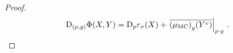 \documentclass[reqno,a4paper,oneside]{amsart}
\newcommand\MC{\mu_{{\rm MC}}}
\theoremstyle{plain}
\theoremstyle{remark}
\theoremstyle{definition}
\def\bas#1\eas{\begin{align*}#1\end{align*}}
\begin{document}
\begin{proof}
\begin{align*}
\mathrm{D}_{(p, g)}\Phi(X, Y)
&=
\mathrm{D}_pr_\sigma(X)
	+ \mleft.{\overline{\mleft( \MC\mright)_g (Y^v)}}\mright|_{p \cdot g}~.
\end{align*}

\end{proof}
\end{document}
